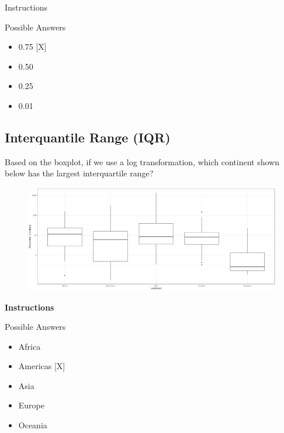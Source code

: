 \documentclass[]{article}
\providecommand{\tightlist}{%
  \setlength{\itemsep}{0pt}\setlength{\parskip}{0pt}}
\begin{document}
Instructions

Possible Answers

\begin{itemize}
\tightlist
\item
  0.75 {[}X{]}
\item
  0.50
\item
  0.25
\item
  0.01
\end{itemize}

\subsection{\texorpdfstring{\textbf{Interquantile Range
(IQR)}}{Interquantile Range (IQR)}}\label{interquantile-range-iqr}

Based on the boxplot, if we use a log transformation, which continent
shown below has the largest interquartile range?

\begin{figure}
\centering
\includegraphics{img1.png}
\caption{}
\end{figure}

\textbf{Instructions}

Possible Answers

\begin{itemize}
\tightlist
\item
  Africa
\item
  Americas {[}X{]}
\item
  Asia
\item
  Europe
\item
  Oceania
\end{itemize}
\end{document}
